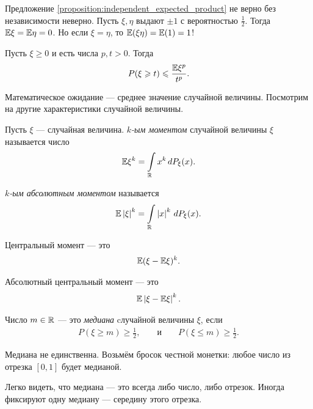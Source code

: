 \begin{remrk}
 Предложение \ref{proposition:independent_expected_product} не верно без независимости неверно. Пусть $ \xi, \eta $ выдают $ \pm 1 $ с вероятностью $ \frac{1}{2} $. Тогда $ \mathbb E\xi = \mathbb E\eta = 0 $. Но если $ \xi = \eta $, то $ \mathbb E(\xi\eta) = \mathbb E(1) = 1 $!
\end{remrk}

\begin{prop}
 Пусть $ \xi \geqslant 0 $ и есть числа $ p,t > 0 $. Тогда
  \begin{align}
   \label{equation:markov_inequality}
  P(\xi \geqslant t) \leqslant \frac{\mathbb E \xi^{p}}{t^{p}}.
 \end{align}  
\end{prop}

Математическое ожидание --- среднее значение случайной величины. Посмотрим на другие характеристики случайной величины.

\begin{df}
 Пусть $ \xi $ --- случайная величина. \textit{$ k $-ым моментом} случайной величины $ \xi $ называется число
 \begin{align*}
  \mathbb E \xi^{k} = \int\limits_{\mathbb{R}} x^{k}\,dP_{\xi}(x).
 \end{align*} 

  \textit{$ k $-ым абсолютным моментом} называется
 \begin{align*}
  \mathbb E \left| \xi \right|^{k} = \int\limits_{\mathbb{R}} \left| x \right|^{k}\,dP_{\xi} (x).
 \end{align*} 

 Центральный момент --- это
 \begin{align*}
  \mathbb E (\xi - \mathbb E \xi)^{k}.
 \end{align*} 

 Абсолютный центральный момент --- это
 \begin{align*}
  \mathbb E \left| \xi - \mathbb E \xi \right|^{k}.
 \end{align*} 
\end{df}

\begin{df}
 Число $ m \in\mathbb{R}$ --- это \textit{медиана} cлучайной величины $ \xi $, если
 \begin{align*}
  P(\xi \geqslant m) \geqslant \frac{1}{2}, & &\text{ и } & &P(\xi \leqslant m) \geqslant \frac{1}{2}.
 \end{align*} 
\end{df}
\begin{remrk*}
 Медиана не единственна. Возьмём бросок честной монетки: любое число из отрезка $ [0,1] $ будет медианой.
\end{remrk*}
\begin{remrk*}
 Легко видеть, что медиана --- это всегда либо число, либо отрезок. Иногда фиксируют одну медиану --- середину этого отрезка.
\end{remrk*}

